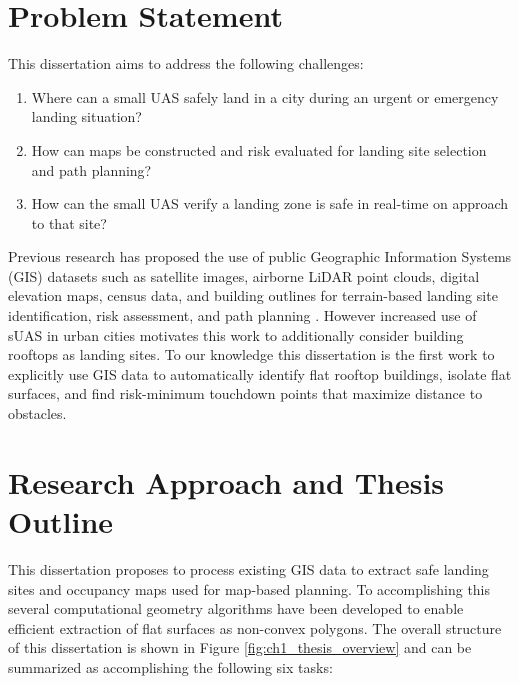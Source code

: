 \section{Problem Statement}

This dissertation aims to address the following challenges:

\begin{enumerate}[noitemsep]
    \itemsep0em 
    \item Where can a small UAS safely land in a city during an urgent or emergency landing situation?
    \item How can maps be constructed and risk evaluated for landing site selection and path planning?
    \item How can the small UAS verify a landing zone is safe in real-time on approach to that site?
\end{enumerate}

Previous research has proposed the use of public Geographic Information Systems (GIS) datasets such as satellite images, airborne LiDAR point clouds, digital elevation maps, census data, and building outlines for terrain-based landing site identification, risk assessment, and path planning \cite{meuleau_emergency_2009, di_donato_evaluating_2017, patterson_timely_2014, bleier_risk_2015}.  However increased use of sUAS in urban cities motivates this work to additionally consider building rooftops as landing sites. To our knowledge this dissertation is the first work to explicitly use GIS data to automatically identify flat rooftop buildings, isolate flat surfaces, and find risk-minimum touchdown points that maximize distance to obstacles. 

\section{Research Approach and Thesis Outline}


This dissertation proposes to process existing GIS data to extract safe landing sites and occupancy maps used for map-based planning. To accomplishing this several computational geometry algorithms have been developed to enable efficient extraction of flat surfaces as non-convex polygons. The overall structure of this dissertation is shown in Figure \ref{fig:ch1_thesis_overview} and can be summarized as accomplishing the following six tasks:

